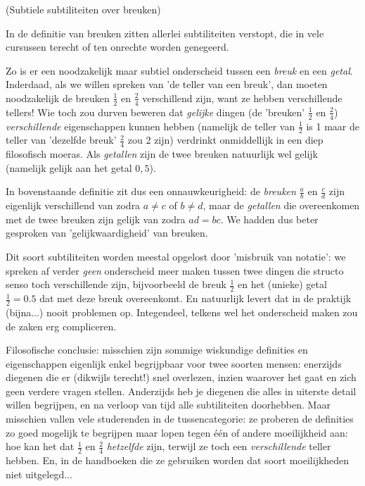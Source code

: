 \documentclass{ximera}
\begin{document}
\begin{xmuitweiding} (Subtiele subtiliteiten over breuken) \label{begrip:misbruik van notatie}  %
\begin{expandable}

		In de definitie van breuken zitten allerlei subtiliteiten verstopt, die in vele cursussen terecht of ten onrechte worden genegeerd. 
		
		Zo is er een noodzakelijk maar subtiel onderscheid tussen een \textit{breuk} en een \textit{getal}. Inderdaad, als we willen spreken van 'de teller van een breuk', dan moeten noodzakelijk de breuken $\frac 12$ en $\frac 24$ verschillend zijn, want ze hebben verschillende tellers! Wie toch zou durven beweren dat \textit{gelijke} dingen (de 'breuken' $\frac 12$ en $\frac 24$)  \textit{verschillende} eigenschappen kunnen hebben (namelijk de teller van $\frac 12$ is 1 maar de teller van 'dezelfde breuk' $\frac24$ zou 2 zijn) verdrinkt onmiddellijk in een diep filosofisch moeras. Als \textit{getallen} zijn de twee breuken natuurlijk wel gelijk (namelijk gelijk aan het getal $0,5$).
		
		In bovenstaande definitie zit dus een onnauwkeurigheid: de \textit{breuken} $\frac ab$ en $\frac cd$ zijn eigenlijk verschillend van zodra $a\neq c$ of $b\neq d$, maar de \textit{getallen} die overeenkomen met de twee breuken zijn gelijk van zodra $ad = bc$. We hadden dus beter gesproken van 'gelijkwaardigheid' van breuken. 
			
		Dit soort subtiliteiten worden meestal opgelost door 'misbruik van notatie': we spreken af verder \textit{geen} onderscheid meer maken tussen twee dingen die structo senso toch verschillende zijn, bijvoorbeeld de breuk $\frac 12$ en het (unieke) getal $\frac 12 = 0.5$ dat met deze breuk overeenkomt. En natuurlijk levert dat in de praktijk (bijna...) nooit problemen op. Integendeel, telkens wel het onderscheid maken zou de zaken erg compliceren. 
		
		Filosofische conclusie: misschien zijn sommige wiskundige definities en eigenschappen eigenlijk enkel begrijpbaar voor twee soorten mensen: enerzijds diegenen die er (dikwijls terecht!) snel overlezen, inzien waarover het gaat en zich geen verdere vragen stellen. Anderzijds heb je diegenen die alles in uiterste detail willen begrijpen, en na verloop van tijd alle subtiliteiten doorhebben. Maar misschien vallen vele studerenden in de tussencategorie: ze proberen de definities zo goed mogelijk te begrijpen maar lopen tegen één of andere moeilijkheid aan: hoe kan het dat $\frac 12$ en $\frac 24$ \textit{hetzelfde} zijn, terwijl ze toch een \textit{verschillende} teller hebben. En, in de handboeken die ze gebruiken worden dat soort moeilijkheden niet uitgelegd...
\end{expandable}
\end{xmuitweiding}
\end{document}
